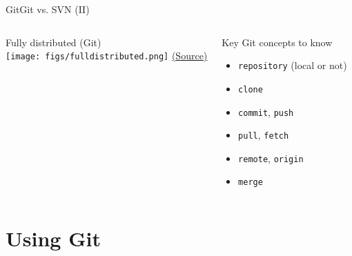 \documentclass[10pt,compress]{beamer} %
\begin{document}


\begin{frame}{Git}{Git vs. SVN (II)}
\begin{center}
\begin{columns}
	\centering Fully distributed (Git)\\\smallskip
	\texttt{[image: figs/fulldistributed.png]}
	\tiny \href{http://softwareengineering.stackexchange.com/questions/35074/im-a-subversion-geek-why-should-i-consider-or-not-consider-mercurial-or-git-or}{(Source)}

	\begin{block}{Key Git concepts to know}
	\begin{itemize}
	\item \texttt{repository} (local or not)
	\item \texttt{clone}
	\item \texttt{commit}, \texttt{push}
	\item \texttt{pull}, \texttt{fetch} 
	\item \texttt{remote}, \texttt{origin}
	\item \texttt{merge}
	\end{itemize}
	\end{block}
\end{columns}
\end{center}
\end{frame}


\section{Using Git}





\end{document}
